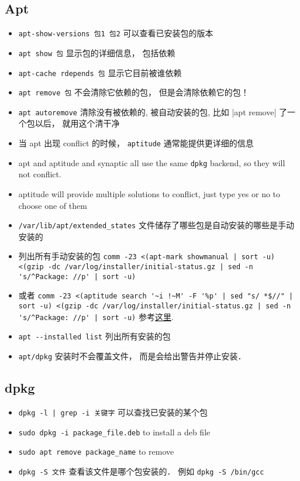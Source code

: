 
\begin{issues}
\issueDraft
\end{issues}

\subsection{Apt}
\begin{itemize}
\item \verb|apt-show-versions 包1 包2| 可以查看已安装包的版本
\item \verb|apt show 包| 显示包的详细信息， 包括依赖
\item \verb|apt-cache rdepends 包| 显示它目前被谁依赖
\item \verb|apt remove 包| 不会清除它依赖的包， 但是会清除依赖它的包！
\item \verb|apt autoremove| 清除没有被依赖的, 被自动安装的包, 比如 \ver|apt remove| 了一个包以后， 就用这个清干净
\item 当 apt 出现 conflict 的时候， \verb|aptitude| 通常能提供更详细的信息
\item apt and aptitude and synaptic all use the same \verb|dpkg| backend, so they will not conflict.
\item aptitude will provide multiple solutions to conflict, just type yes or no to choose one of them
\item \verb|/var/lib/apt/extended_states| 文件储存了哪些包是自动安装的哪些是手动安装的
\item 列出所有手动安装的包 \verb`comm -23 <(apt-mark showmanual | sort -u) <(gzip -dc /var/log/installer/initial-status.gz | sed -n 's/^Package: //p' | sort -u)`
\item 或者 \verb`comm -23 <(aptitude search '~i !~M' -F '%p' | sed "s/ *$//" | sort -u) <(gzip -dc /var/log/installer/initial-status.gz | sed -n 's/^Package: //p' | sort -u)` 参考\href{https://askubuntu.com/questions/2389/how-to-list-manually-installed-packages}{这里}.
\item \verb|apt --installed list| 列出所有安装的包
\item \verb|apt/dpkg| 安装时不会覆盖文件， 而是会给出警告并停止安装．
\end{itemize}

\subsection{dpkg}
\begin{itemize}
\item \verb`dpkg -l | grep -i 关键字` 可以查找已安装的某个包
\item \verb|sudo dpkg -i package_file.deb| to install a deb file
\item \verb|sudo apt remove package_name| to remove
\item \verb|dpkg -S 文件| 查看该文件是哪个包安装的． 例如 \verb|dpkg -S /bin/gcc|
\end{itemize}

